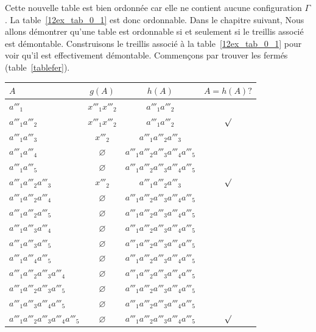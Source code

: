\documentclass[a4paper]{report}
\renewcommand{\textbf}[1]{\begingroup\bfseries\mathversion{bold}#1\endgroup}
\begin{document}
Cette nouvelle table est bien ordonnée car elle ne contient aucune configuration $\Gamma$. La table~\ref{12ex_tab_0_1} est donc ordonnable. 
Dans le chapitre suivant, Nous allons démontrer qu'une table est ordonnable si et seulement si le treillis associé est démontable. 
Construisons le treillis associé à la table~\ref{12ex_tab_0_1} pour voir qu'il est effectivement démontable.
Commençons par trouver les fermés (table~\ref{tablefer}).
\begin{table}[htb]

\centering

\begin{tabular}{l|c|c|c}

$A$ & $g(A)$ & $h(A)$ & $A = h(A) ?$\\
\hline
$a'''_1$ & $x'''_1x'''_2$ & $a'''_1a'''_2$ & \\
\hline
\textbf{$a'''_1a'''_2$} & \textbf{$x'''_1x'''_2$} & $a'''_1a'''_2$ & $\surd$\\
\hline
$a'''_1a'''_3$ &$x'''_2$ & $a'''_1a'''_2a'''_3$ & \\
\hline
$a'''_1a'''_4$ & $\varnothing$ & $a'''_1a'''_2a'''_3a'''_4a'''_5$ & \\
\hline
$a'''_1a'''_5$ & $\varnothing$ & $a'''_1a'''_2a'''_3a'''_4a'''_5$ & \\
\hline
\textbf{$a'''_1a'''_2a'''_3$} & \textbf{$x'''_2$} & $a'''_1a'''_2a'''_3$ & $\surd$\\
\hline
$a'''_1a'''_2a'''_4$ & $\varnothing$ & $a'''_1a'''_2a'''_3a'''_4a'''_5$ & \\
\hline
$a'''_1a'''_2a'''_5$ & $\varnothing$ & $a'''_1a'''_2a'''_3a'''_4a'''_5$ & \\
\hline
$a'''_1a'''_3a'''_4$ & $\varnothing$ & $a'''_1a'''_2a'''_3a'''_4a'''_5$ & \\
\hline
$a'''_1a'''_3a'''_5$ & $\varnothing$ & $a'''_1a'''_2a'''_3a'''_4a'''_5$ & \\
\hline
$a'''_1a'''_4a'''_5$ & $\varnothing$ & $a'''_1a'''_2a'''_3a'''_4a'''_5$ & \\
\hline
$a'''_1a'''_2a'''_3a'''_4$ & $\varnothing$ & $a'''_1a'''_2a'''_3a'''_4a'''_5$ & \\
\hline
$a'''_1a'''_2a'''_3a'''_5$ & $\varnothing$ & $a'''_1a'''_2a'''_3a'''_4a'''_5$ & \\
\hline
$a'''_1a'''_3a'''_4a'''_5$ & $\varnothing$ & $a'''_1a'''_2a'''_3a'''_4a'''_5$ & \\
\hline
\textbf{$a'''_1a'''_2a'''_3a'''_4a'''_5$} & \textbf{$\varnothing$} & $a'''_1a'''_2a'''_3a'''_4a'''_5$ & $\surd$\\

\end{tabular}
\end{table}
\end{document}
